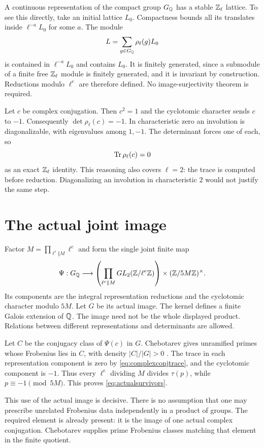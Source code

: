A continuous representation of the compact group $G_{\mathbb Q}$ has a stable $\mathbb Z_\ell$ lattice. To see this directly, take an initial lattice $L_0$. Compactness bounds all its translates inside $\ell^{-a}L_0$ for some $a$. The module
\[
L=\sum_{g\in G_{\mathbb Q}}\rho_\ell(g)L_0
\]
is contained in $\ell^{-a}L_0$ and contains $L_0$. It is finitely generated, since a submodule of a finite free $\mathbb Z_\ell$ module is finitely generated, and it is invariant by construction. Reductions modulo $\ell^e$ are therefore defined. No image-surjectivity theorem is required.

Let $c$ be complex conjugation. Then $c^2=1$ and the cyclotomic character sends $c$ to $-1$. Consequently $\det\rho_\ell(c)=-1$. In characteristic zero an involution is diagonalizable, with eigenvalues among $1,-1$. The determinant forces one of each, so
\begin{equation}\label{eq:complexconjtrace}
\operatorname{Tr}\rho_\ell(c)=0
\end{equation}
as an exact $\mathbb Z_\ell$ identity. This reasoning also covers $\ell=2$: the trace is computed before reduction. Diagonalizing an involution in characteristic $2$ would not justify the same step.

\section{The actual joint image}
Factor $M=\prod_{\ell^e\Vert M}\ell^e$ and form the single joint finite map
\begin{equation}\label{eq:jointimage}
\Psi:G_{\mathbb Q}\longrightarrow
\left(\prod_{\ell^e\Vert M}GL_2(\mathbb Z/\ell^e\mathbb Z)\right)
\times(\mathbb Z/5M\mathbb Z)^\times.
\end{equation}
Its components are the integral representation reductions and the cyclotomic character modulo $5M$. Let $G$ be its actual image. The kernel defines a finite Galois extension of $\mathbb Q$. The image need not be the whole displayed product. Relations between different representations and determinants are allowed.

Let $C$ be the conjugacy class of $\Psi(c)$ in $G$. Chebotarev gives unramified primes whose Frobenius lies in $C$, with density $|C|/|G|>0$ \cite{Chebotarev}. The trace in each representation component is zero by \eqref{eq:complexconjtrace}, and the cyclotomic component is $-1$. Thus every $\ell^e$ dividing $M$ divides $\tau(p)$, while $p\equiv-1\pmod{5M}$. This proves \eqref{eq:actualsurvivors}.

This use of the actual image is decisive. There is no assumption that one may prescribe unrelated Frobenius data independently in a product of groups. The required element is already present: it is the image of one actual complex conjugation. Chebotarev supplies prime Frobenius classes matching that element in the finite quotient.

